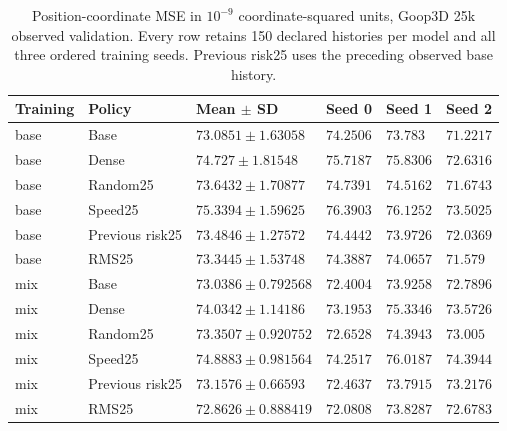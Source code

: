 \begin{table}[p]
\centering\scriptsize
\caption{Position-coordinate MSE in $10^{-9}$ coordinate-squared units, Goop3D 25k observed validation. Every row retains 150 declared histories per model and all three ordered training seeds. Previous risk25 uses the preceding observed base history.}
\label{tab:goop3d25k-observed-position-validation}
\setlength{\tabcolsep}{3pt}
\begin{tabular}{llllll}
\toprule
Training & Policy & Mean $\pm$ SD & Seed 0 & Seed 1 & Seed 2\\
\midrule
base & Base & $73.0851\pm1.63058$ & $74.2506$ & $73.783$ & $71.2217$\\
base & Dense & $74.727\pm1.81548$ & $75.7187$ & $75.8306$ & $72.6316$\\
base & Random25 & $73.6432\pm1.70877$ & $74.7391$ & $74.5162$ & $71.6743$\\
base & Speed25 & $75.3394\pm1.59625$ & $76.3903$ & $76.1252$ & $73.5025$\\
base & Previous risk25 & $73.4846\pm1.27572$ & $74.4442$ & $73.9726$ & $72.0369$\\
base & RMS25 & $73.3445\pm1.53748$ & $74.3887$ & $74.0657$ & $71.579$\\
mix & Base & $73.0386\pm0.792568$ & $72.4004$ & $73.9258$ & $72.7896$\\
mix & Dense & $74.0342\pm1.14186$ & $73.1953$ & $75.3346$ & $73.5726$\\
mix & Random25 & $73.3507\pm0.920752$ & $72.6528$ & $74.3943$ & $73.005$\\
mix & Speed25 & $74.8883\pm0.981564$ & $74.2517$ & $76.0187$ & $74.3944$\\
mix & Previous risk25 & $73.1576\pm0.66593$ & $72.4637$ & $73.7915$ & $73.2176$\\
mix & RMS25 & $72.8626\pm0.888419$ & $72.0808$ & $73.8287$ & $72.6783$\\
\bottomrule
\end{tabular}
\end{table}


